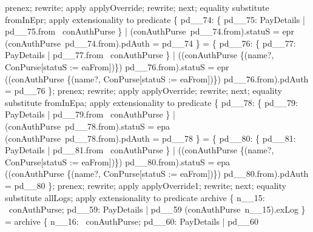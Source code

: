 \begin{LPScript}
\begin{zproof}[lPromotedAuxWorldAbortType]
            prenex;
            rewrite;
            apply applyOverride;
            rewrite;
        next;
            equality substitute fromInEpr;
            apply extensionality to predicate
            \{ pd\_\_74: \{ pd\_\_75: PayDetails | pd\_\_75.from \in \dom~conAuthPurse \}
                |       (conAuthPurse~pd\_\_74.from).statuS = epr \\
                    \land (conAuthPurse~pd\_\_74.from).pdAuth = pd\_\_74 \}
            = \{ pd\_\_76:
                    \{ pd\_\_77: PayDetails | pd\_\_77.from \in \dom~conAuthPurse \}
                    |       ((conAuthPurse
                            \oplus \{(name?, \theta ConPurse[statuS := eaFrom])\})
                            pd\_\_76.from).statuS
                            = epr \\
                    \land ((conAuthPurse
                            \oplus \{(name?, \theta ConPurse[statuS := eaFrom])\})
                            pd\_\_76.from).pdAuth
                            = pd\_\_76 \};
            prenex;
            rewrite;
            apply applyOverride;
            rewrite;
        next;
            equality substitute fromInEpa;
            apply extensionality to predicate
            \{ pd\_\_78: \{ pd\_\_79: PayDetails | pd\_\_79.from \in \dom~conAuthPurse \}
                |       (conAuthPurse~pd\_\_78.from).statuS = epa \\
                    \land (conAuthPurse~pd\_\_78.from).pdAuth = pd\_\_78 \}
            = \{ pd\_\_80:
                    \{ pd\_\_81: PayDetails | pd\_\_81.from \in \dom~conAuthPurse \}
                    |       ((conAuthPurse
                            \oplus \{(name?, \theta ConPurse[statuS := eaFrom])\})
                            pd\_\_80.from).statuS
                            = epa \\
                    \land ((conAuthPurse
                            \oplus \{(name?, \theta ConPurse[statuS := eaFrom])\})
                            pd\_\_80.from).pdAuth
                            = pd\_\_80 \};
            prenex;
            rewrite;
            apply applyOverride1;
            rewrite;
        next;
            equality substitute allLogs;
            apply extensionality to predicate
            archive
            \cup \{ n\_\_15: \dom~conAuthPurse; pd\_\_59: PayDetails
                        | pd\_\_59 \in (conAuthPurse~n\_\_15).exLog \}
            = archive
                \cup \{ n\_\_16: \dom~conAuthPurse; pd\_\_60: PayDetails
                        | pd\_\_60

\end{zproof}
\end{LPScript}
